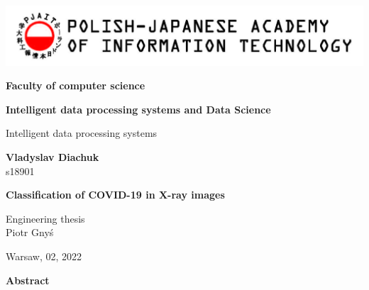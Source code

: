 \documentclass{article}
\begin{document}
\begin{titlepage}          
	\sffamily                                                                              
	\includegraphics[width=\textwidth]{pjwstk_logo_en}
	
	\vspace{1.4cm}
	
	\begin{center}
		{
			\Large
			\textbf{Faculty of computer science}
			\vspace{1.4cm}
			
			\textbf{Intelligent data processing systems and Data Science}
			\vspace{0.5cm}
			
			Intelligent data processing systems
			\vspace{1.4cm}
			
			\textbf{Vladyslav Diachuk}\\
			s18901
		}
		\vspace{1.2cm}
		
		{\huge\textbf{Classification of COVID-19 in X-ray images}}
	\end{center}
	\vspace{2cm}
	
	\begin{flushright}
		\Large
		Engineering thesis\\	
		\vspace{0.4cm}	
		Piotr Gnyś
	\end{flushright}
	\vspace{3cm}
	
	\begin{center}
		\Large
		Warsaw, 02, 2022
	\end{center}
	
\end{titlepage}

\begin{flushleft}
	\Large 
	\textbf{Abstract}\\
\end{flushleft}
\end{document}
